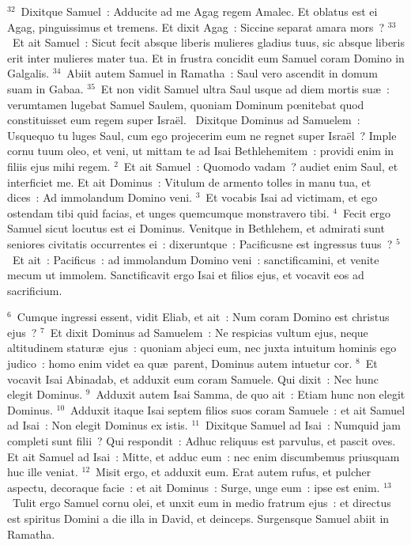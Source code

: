 ${}^{32}$~Dixitque Samuel~: Adducite ad me Agag regem Amalec. Et oblatus est ei Agag, pinguissimus et tremens. Et dixit Agag~: Siccine separat amara mors~?
${}^{33}$~Et ait Samuel~: Sicut fecit absque liberis mulieres gladius tuus, sic absque liberis erit inter mulieres mater tua. Et in frustra concidit eum Samuel coram Domino in Galgalis.
${}^{34}$~Abiit autem Samuel in Ramatha~: Saul vero ascendit in domum suam in Gabaa.
${}^{35}$~Et non vidit Samuel ultra Saul usque ad diem mortis su\ae~: verumtamen lugebat Samuel Saulem, quoniam Dominum pœnitebat quod constituisset eum regem super Isra\"el.
~Dixitque Dominus ad Samuelem~: Usquequo tu luges Saul, cum ego projecerim eum ne regnet super Isra\"el~? Imple cornu tuum oleo, et veni, ut mittam te ad Isai Bethlehemitem~: providi enim in filiis ejus mihi regem.
${}^{2}$~Et ait Samuel~: Quomodo vadam~? audiet enim Saul, et interficiet me. Et ait Dominus~: Vitulum de armento tolles in manu tua, et dices~: Ad immolandum Domino veni.
${}^{3}$~Et vocabis Isai ad victimam, et ego ostendam tibi quid facias, et unges quemcumque monstravero tibi.
${}^{4}$~Fecit ergo Samuel sicut locutus est ei Dominus. Venitque in Bethlehem, et admirati sunt seniores civitatis occurrentes ei~: dixeruntque~: Pacificusne est ingressus tuus~?
${}^{5}$~Et ait~: Pacificus~: ad immolandum Domino veni~: sanctificamini, et venite mecum ut immolem. Sanctificavit ergo Isai et filios ejus, et vocavit eos ad sacrificium.


${}^{6}$~Cumque ingressi essent, vidit Eliab, et ait~: Num coram Domino est christus ejus~?
${}^{7}$~Et dixit Dominus ad Samuelem~: Ne respicias vultum ejus, neque altitudinem statur\ae\ ejus~: quoniam abjeci eum, nec juxta intuitum hominis ego judico~: homo enim videt ea qu\ae\ parent, Dominus autem intuetur cor.
${}^{8}$~Et vocavit Isai Abinadab, et adduxit eum coram Samuele. Qui dixit~: Nec hunc elegit Dominus.
${}^{9}$~Adduxit autem Isai Samma, de quo ait~: Etiam hunc non elegit Dominus.
${}^{10}$~Adduxit itaque Isai septem filios suos coram Samuele~: et ait Samuel ad Isai~: Non elegit Dominus ex istis.
${}^{11}$~Dixitque Samuel ad Isai~: Numquid jam completi sunt filii~? Qui respondit~: Adhuc reliquus est parvulus, et pascit oves. Et ait Samuel ad Isai~: Mitte, et adduc eum~: nec enim discumbemus priusquam huc ille veniat.
${}^{12}$~Misit ergo, et adduxit eum. Erat autem rufus, et pulcher aspectu, decoraque facie~: et ait Dominus~: Surge, unge eum~: ipse est enim.
${}^{13}$~Tulit ergo Samuel cornu olei, et unxit eum in medio fratrum ejus~: et directus est spiritus Domini a die illa in David, et deinceps. Surgensque Samuel abiit in Ramatha.


